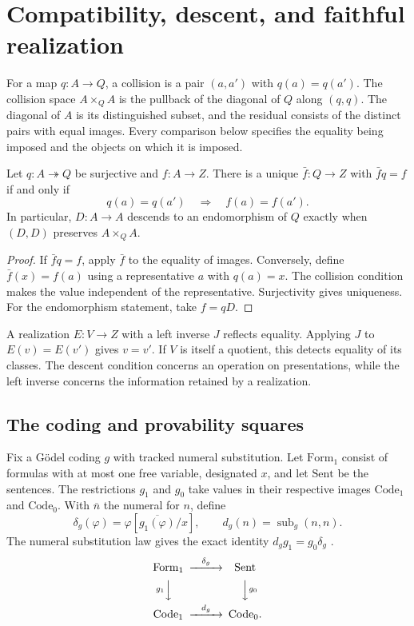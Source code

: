 \section{Compatibility, descent, and faithful realization}
\label{sec:compatibility}

For a map \(q\colon A\to Q\), a collision is a pair \((a,a')\) with
\(q(a)=q(a')\). The collision space \(A\times_Q A\) is the pullback of the
diagonal of \(Q\) along \((q,q)\). The diagonal of \(A\) is its distinguished
subset, and the residual consists of the distinct pairs with equal images.
Every comparison below specifies the equality being imposed and the objects
on which it is imposed.

\begin{proposition}\label{prop:descent}
Let \(q\colon A\twoheadrightarrow Q\) be surjective and \(f\colon A\to Z\).
There is a unique \(\bar f\colon Q\to Z\) with \(\bar f q=f\) if and only if
\[
  q(a)=q(a')\quad\Longrightarrow\quad f(a)=f(a').
\]
In particular, \(D\colon A\to A\) descends to an endomorphism of \(Q\)
exactly when \((D,D)\) preserves \(A\times_Q A\).
\end{proposition}

\begin{proof}
If \(\bar f q=f\), apply \(\bar f\) to the equality of images.
Conversely, define \(\bar f(x)=f(a)\) using a representative \(a\) with
\(q(a)=x\). The collision condition makes the value independent of the
representative. Surjectivity gives uniqueness. For the endomorphism
statement, take \(f=qD\).
\end{proof}

A realization \(E\colon V\to Z\) with a left inverse \(J\) reflects
equality. Applying \(J\) to \(E(v)=E(v')\) gives \(v=v'\). If \(V\) is
itself a quotient, this detects equality of its classes. The descent
condition concerns an operation on presentations, while the left inverse
concerns the information retained by a realization.

\subsection{The coding and provability squares}

Fix a G\"odel coding \(g\) with tracked numeral substitution. Let
\(\mathrm{Form}_1\) consist of formulas with at most one free variable,
designated \(x\), and let \(\mathrm{Sent}\) be the sentences. The restrictions
\(g_1\) and \(g_0\) take values in their respective images
\(\mathrm{Code}_1\) and \(\mathrm{Code}_0\). With \(\overline n\) the numeral
for \(n\), define
\[
  \delta_g(\varphi)=\varphi[\overline{g_1(\varphi)}/x],
  \qquad d_g(n)=\operatorname{sub}_g(n,n).
\]
The numeral substitution law gives the exact identity
\(d_g g_1=g_0\delta_g\) \cite{grabmayr,goldfarb}.
\begin{equation}\label{eq:coding}
\begin{CD}
  \mathrm{Form}_1 @>{\delta_g}>> \mathrm{Sent}\\
  @V{g_1}VV @VV{g_0}V\\
  \mathrm{Code}_1 @>{d_g}>> \mathrm{Code}_0 .
\end{CD}
\end{equation}

